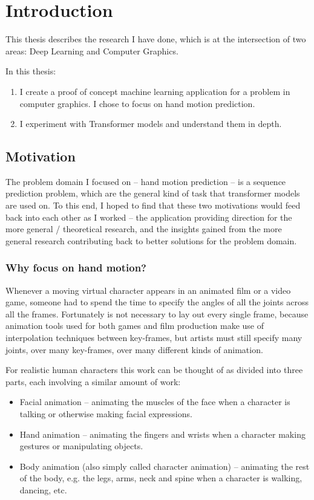 \chapter{Introduction}
\label{C:intro}

This thesis describes the research I have done, which is at the intersection of two areas: Deep Learning and Computer Graphics.

In this thesis:
\begin{enumerate}
    \item I create a proof of concept machine learning application for a problem in computer graphics. I chose to focus on hand motion prediction.
    \item I experiment with Transformer models and understand them in depth.
\end{enumerate}


\section{Motivation}
\label{s:motivation}
The problem domain I focused on -- hand motion prediction -- is a sequence prediction problem, which are  the general kind of task that transformer models are used on. To this end, I hoped to find that these two motivations would feed back into each other as I worked -- the application providing direction for the more general / theoretical research, and the insights gained from the more general research contributing back to better solutions for the problem domain.

\subsection{Why focus on hand motion?}
\label{ss:why-hand-motion}

Whenever a moving virtual character appears in an animated film or a video game, someone had to spend the time to specify the angles of all the joints across all the frames. Fortunately is not necessary to lay out every single frame, because animation tools used for both games and film production make use of interpolation techniques between key-frames, but artists must still specify many joints, over many key-frames, over many different kinds of animation.

For realistic human characters this work can be thought of as divided into three parts, each involving a similar amount of work:
\begin{itemize}
    \item Facial animation -- animating the muscles of the face when a character is talking or otherwise making facial expressions.
    \item Hand animation -- animating the fingers and wrists when a character making gestures or manipulating objects.
    \item Body animation (also simply called character animation) -- animating the rest of the body, e.g. the legs, arms, neck and spine when a character is walking, dancing, etc.
\end{itemize}

